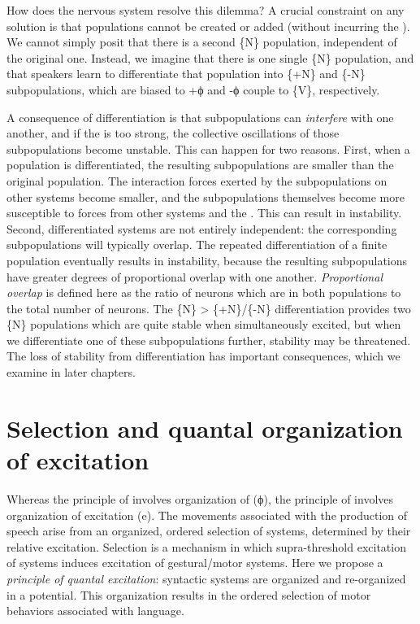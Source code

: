   How does the nervous system resolve this dilemma? A crucial constraint on any solution is that populations cannot be created or added (without incurring the ). We cannot simply posit that there is a second \{N\} population, independent of the original one. Instead, we imagine that there is one single \{N\} population, and that speakers learn to differentiate that population into \{+N\} and \{-N\} subpopulations, which are biased to +ϕ and -ϕ couple to \{V\}, respectively.

  A consequence of differentiation is that subpopulations can \textit{interfere} with one another, and if the  is too strong, the collective oscillations of those subpopulations become unstable. This can happen for two reasons. First, when a population is differentiated, the resulting subpopulations are smaller than the original population. The interaction forces exerted by the subpopulations on other systems become smaller, and the subpopulations themselves become more susceptible to forces from other systems and the . This can result in instability. Second, differentiated systems are not entirely independent: the corresponding subpopulations will typically overlap. The repeated differentiation of a finite population eventually results in instability, because the resulting subpopulations have greater degrees of proportional overlap with one another. \textit{Proportional overlap} is defined here as the ratio of neurons which are in both populations to the total number of neurons. The \{N\} > \{+N\}/\{-N\} differentiation provides two \{N\} populations which are quite stable when simultaneously excited, but when we differentiate one of these subpopulations further, stability may be threatened. The loss of stability from differentiation has important consequences, which we examine in later chapters.

\section{Selection and quantal organization of excitation}

Whereas the principle of  involves organization of  (ϕ), the principle of  involves organization of excitation (e). The movements associated with the production of speech arise from an organized, ordered selection of systems, determined by their relative excitation. Selection is a mechanism in which supra-threshold excitation of systems induces excitation of gestural/motor systems. Here we propose a \textit{principle of quantal excitation}: syntactic systems are organized and re-organized in a  potential. This organization results in the ordered selection of motor behaviors associated with language.

